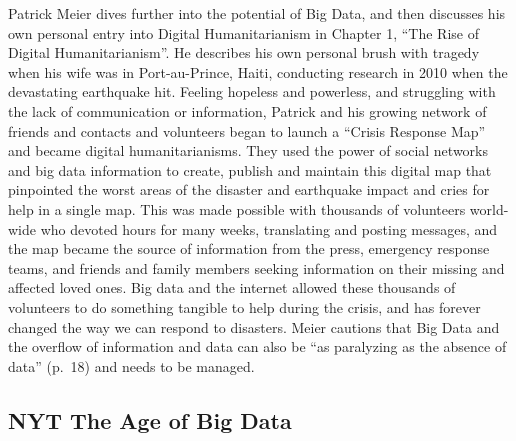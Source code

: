 \documentclass[]{book}
\begin{document}
Patrick Meier dives further into the potential of Big Data, and then discusses his own personal entry into Digital
Humanitarianism in Chapter 1, ``The Rise of Digital Humanitarianism''. He describes his own personal brush with tragedy
when his wife was in Port-au-Prince, Haiti, conducting research in 2010 when the devastating earthquake hit. Feeling
hopeless and powerless, and struggling with the lack of communication or information, Patrick and his growing network of
friends and contacts and volunteers began to launch a ``Crisis Response Map'' and became digital humanitarianisms. They
used the power of social networks and big data information to create, publish and maintain this digital map that pinpointed
the worst areas of the disaster and earthquake impact and cries for help in a single map. This was made possible with
thousands of volunteers world-wide who devoted hours for many weeks, translating and posting messages, and the map became
the source of information from the press, emergency response teams, and friends and family members seeking information on
their missing and affected loved ones. Big data and the internet allowed these thousands of volunteers to do something
tangible to help during the crisis, and has forever changed the way we can respond to disasters. Meier cautions that
Big Data and the overflow of information and data can also be ``as paralyzing as the absence of data'' (p.~18) and needs to be managed.

\hypertarget{nyt-the-age-of-big-data}{%
\subsection{\texorpdfstring{NYT \textbf{The Age of Big Data}}{NYT The Age of Big Data}}\label{nyt-the-age-of-big-data}}
\end{document}
